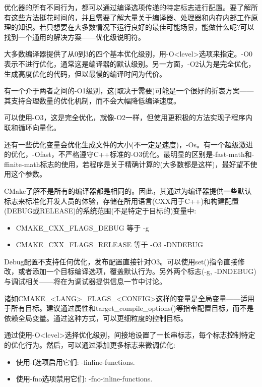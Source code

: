 
优化器的所有不同行为，都可以通过编译选项传递的特定标志进行配置。要了解所有这些方法挺花时间的，并且需要了解大量关于编译器、处理器和内存内部工作原理的知识。若只想要在大多数情况下运行良好的最佳可能场景，能做什么呢?可以找到一个通用的解决方案——优化级说明符。

大多数编译器提供了从0到3的四个基本优化级别，用-O<level>选项来指定。-O0表示不进行优化，通常这是编译器的默认级别。另一方面，-O2认为是完全优化，生成高度优化的代码，但以最慢的编译时间为代价。

有一个介于两者之间的-O1级别，这(取决于需要)可能是一个很好的折衷方案——其支持合理数量的优化机制，而不会大幅降低编译速度。

可以使用-O3，这是完全优化，就像-O2一样，但使用更积极的方法实现子程序内联和循环向量化。

还有一些优化变量会优化生成文件的大小(不一定是速度)，-Os。有一个超级激进的优化，-Ofast，不严格遵守C++标准的-O3优化。最明显的区别是-fast-math和-ffinite-math标志的使用，若程序是关于精确计算的(大多数都是这样)，最好望不使用这个参数。

CMake了解不是所有的编译器都是相同的。因此，其通过为编译器提供一些默认标志来标准化开发人员的体验，存储在所用语言(CXX用于C++)和构建配置(DEBUG或RELEASE)的系统范围(不是特定于目标的)变量中:

\begin{itemize}
\item 
CMAKE\_CXX\_FLAGS\_DEBUG 等于 -g

\item 
CMAKE\_CXX\_FLAGS\_RELEASE 等于 -O3 -DNDEBUG
\end{itemize}

Debug配置不支持任何优化，发布配置直接针对O3。可以使用set()指令直接修改，或者添加一个目标编译选项，覆盖默认行为。另外两个标志(-g, -DNDEBUG)与调试相关——将在为调试器提供信息一节中讨论。

诸如CMAKE\_<LANG>\_FLAGS\_<CONFIG>这样的变量是全局变量——适用于所有目标。建议通过属性和target\_compile\_options()等指令配置目标，而不是依赖全局变量。通过这种方式，可以更细粒度的控制目标。

通过使用-O<level>选择优化级别，间接地设置了一长串标志，每个标志控制特定的优化行为。然后，可以通过添加更多标志来微调优化:

\begin{itemize}
\item 
使用-f选项启用它们: -finline-functions.
	
\item 
使用-fno选项禁用它们: -fno-inline-functions.
\end{itemize}

